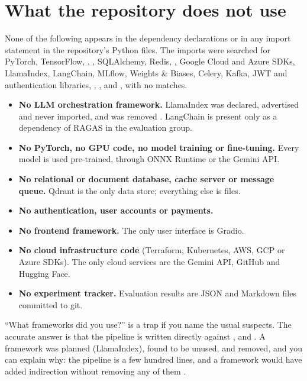 \section{What the repository does not use}
\label{sec:not-used}

None of the following appears in the dependency declarations or in any import statement in the repository's Python files. The imports were searched for PyTorch, TensorFlow, , , SQLAlchemy, Redis, , Google Cloud and Azure SDKs, LlamaIndex, LangChain, MLflow, Weights \& Biases, Celery, Kafka, JWT and authentication libraries, , ,  and , with no matches.

\begin{itemize}
  \item \textbf{No LLM orchestration framework.} LlamaIndex was declared, advertised and never imported, and was removed . LangChain is present only as a dependency of RAGAS in the evaluation group.
  \item \textbf{No PyTorch, no GPU code, no model training or fine-tuning.} Every model is used pre-trained, through ONNX Runtime or the Gemini API.
  \item \textbf{No relational or document database, cache server or message queue.} Qdrant is the only data store; everything else is files.
  \item \textbf{No authentication, user accounts or payments.}
  \item \textbf{No frontend framework.} The only user interface is Gradio.
  \item \textbf{No cloud infrastructure code} (Terraform, Kubernetes, AWS, GCP or Azure SDKs). The only cloud services are the Gemini API, GitHub and Hugging Face.
  \item \textbf{No experiment tracker.} Evaluation results are JSON and Markdown files committed to git.
\end{itemize}

\begin{interview}
\enquote{What frameworks did you use?} is a trap if you name the usual suspects. The accurate answer is that the pipeline is written directly against ,  and . A framework was planned (LlamaIndex), found to be unused, and removed, and you can explain why: the pipeline is a few hundred lines, and a framework would have added indirection without removing any of them .
\end{interview}
